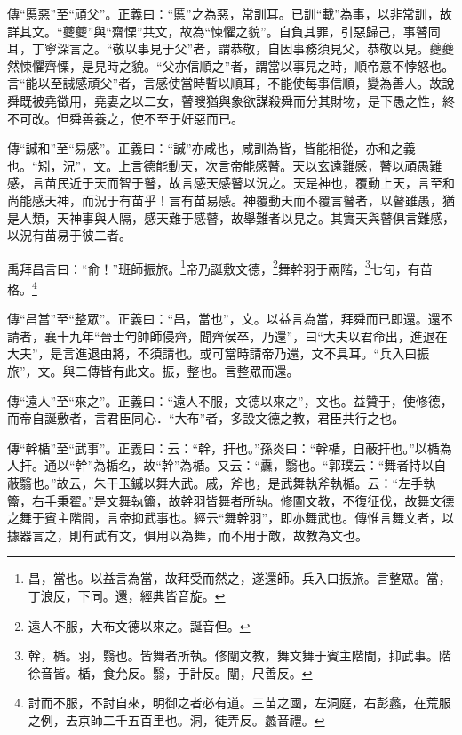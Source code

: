 {\noindent\zhuan{}\fzbyks 傳“慝惡”至“頑父”。正義曰：“慝”之為惡，常訓耳。已訓“載”為事，以非常訓，故詳其文。“夔夔”與“齋慄”共文，故為“悚懼之貌”。自負其罪，引惡歸己，事瞽同耳，丁寧深言之。“敬以事見于父”者，謂恭敬，自因事務須見父，恭敬以見。夔夔然悚懼齊慄，是見時之貌。“父亦信順之”者，謂當以事見之時，順帝意不悖怒也。言“能以至誠感頑父”者，言感使當時暫以順耳，不能使每事信順，變為善人。故說舜既被堯徵用，堯妻之以二女，瞽瞍猶與象欲謀殺舜而分其財物，是下愚之性，終不可改。但舜善養之，使不至于奸惡而已。 \par}

{\noindent\zhuan{}\fzbyks 傳“諴和”至“易感”。正義曰：“諴”亦咸也，咸訓為皆，皆能相從，亦和之義也。“矧，況”，文。上言德能動天，次言帝能感瞽。天以玄遠難感，瞽以頑愚難感，言苗民近于天而智于瞽，故言感天感瞽以況之。天是神也，覆動上天，言至和尚能感天神，而況于有苗乎！言有苗易感。神覆動天而不覆言瞽者，以瞽雖愚，猶是人類，天神事與人隔，感天難于感瞽，故舉難者以見之。其實天與瞽俱言難感，以況有苗易于彼二者。 \par}

禹拜昌言曰：“俞！”班師振旅。\footnote{昌，當也。以益言為當，故拜受而然之，遂還師。兵入曰振旅。言整眾。當，丁浪反，下同。還，經典皆音旋。}帝乃誕敷文德，\footnote{遠人不服，大布文德以來之。誕音但。}舞幹羽于兩階，\footnote{幹，楯。羽，翳也。皆舞者所執。修闡文教，舞文舞于賓主階間，抑武事。階徐音皆。楯，食允反。翳，于計反。闡，尺善反。}七旬，有苗格。\footnote{討而不服，不討自來，明御之者必有道。三苗之國，左洞庭，右彭蠡，在荒服之例，去京師二千五百里也。洞，徒弄反。蠡音禮。}

{\noindent\zhuan{}\fzbyks 傳“昌當”至“整眾”。正義曰：“昌，當也”，文。以益言為當，拜舜而已即還。還不請者，襄十九年“晉士匄帥師侵齊，聞齊侯卒，乃還”，曰“大夫以君命出，進退在大夫”，是言進退由將，不須請也。或可當時請帝乃還，文不具耳。“兵入曰振旅”，文。與二傳皆有此文。振，整也。言整眾而還。 \par}

{\noindent\zhuan{}\fzbyks 傳“遠人”至“來之”。正義曰：“遠人不服，文德以來之”，文也。益贊于，使修德，而帝自誕敷者，言君臣同心．“大布”者，多設文德之教，君臣共行之也。 \par}

{\noindent\zhuan{}\fzbyks 傳“幹楯”至“武事”。正義曰：云：“幹，扞也。”孫炎曰：“幹楯，自蔽扞也。”以楯為人扞。通以“幹”為楯名，故“幹”為楯。又云：“纛，翳也。“郭璞云：“舞者持以自蔽翳也。”故云，朱干玉鏚以舞大武。戚，斧也，是武舞執斧執楯。云：“左手執籥，右手秉翟。”是文舞執籥，故幹羽皆舞者所執。修闡文教，不復征伐，故舞文德之舞于賓主階間，言帝抑武事也。經云“舞幹羽”，即亦舞武也。傳惟言舞文者，以據器言之，則有武有文，俱用以為舞，而不用于敵，故教為文也。 \par}

